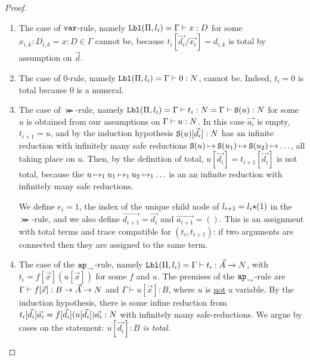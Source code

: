 \begin{proof}
\begin{enumerate}
\item
  The case of ${\tt var}$-rule, namely ${\tt Lbl}(\Pi,l_i) = \Gamma\vdash x:D$ 
  for some $x_{i,k}:D_{i,k} = x:D \in \Gamma$
  cannot be, because $t_i [\vec{d_i}/\vec{x_i}] = d_{i,k}$ is total  by assumption on $\vec{d}$.
  
\item
  The case of $0$-rule, namely ${\tt Lbl}(\Pi,l_i) = \Gamma\vdash 0:{N}$, 
  cannot be. Indeed, $t_i = 0$ is total because $0$ is a numeral.


\item 
  The case of $\Succ$-rule, 
namely ${\tt Lbl}(\Pi,l_i) = \Gamma\vdash t_i: {N} = \Gamma\vdash {\tt S}(u): {N}$
  for some $u$ is obtained from our assumptions on
  $\Gamma\vdash u: {N}$. In this case $\vec{a_i}$ is empty, $t_{i+1}=u$, and
  by the induction hypothesis ${\tt S}(u)[\vec{d_i}]:{N}$ has an infinite reduction with
  infinitely many safe reductions
  ${\tt S}(u) \mathbin{\mapsto}  {\tt S}(u_1) \mathbin{\mapsto} {\tt S}(u_2) \mathbin{\mapsto} \ldots$,
  all taking place on $u$.
  Then, by the definition of total, $u[\vec{d_i}] =t_{i+1}[\vec{d_i}] $ is not total, because the
 $u \mathbin{\mapsto}_1  u_1 \mathbin{\mapsto}_1 u_2 \mathbin{\mapsto}_1 \ldots$ is an  an infinite reduction with
  infinitely many safe reductions.

  We define $e_{i}=1$, 
  the index of the unique child node of $l_{i+1}=l_i{\star}(1)$ in the $\Succ$-rule, and
  we also define $\vec{d_{i+1}} = \vec{d_i}$ and $\vec{a_{i+1}} = ()$. 
  This is an assignment with total terms and 
  trace compatible for $(t_i,t_{i+1})$: if two arguments are connected then they are assigned
  to the same term. 



\item
  The case of the ${{\tt ap}_{\mbox{\tiny $\neg v$}}}$-rule, namely 
  ${\tt Lbl}(\Pi,l_i) = \Gamma\vdash t_i: \vec{A}\rightarrow{N}$, 
  with $t_i = f[\vec{x}](u[\vec{x}])$ for some $f$ and $u$.
  The premises of the ${{\tt ap}_{\mbox{\tiny $\neg v$}}}$-rule
   are $\Gamma\vdash f[\vec{x}]: B \rightarrow \vec{A}\rightarrow{N}$ 
  and $\Gamma\vdash u[\vec{x}]: B$, where $u$ is \underline{not} a variable.
  By the induction hypothesis, there is some infine reduction from
  $t_i[\vec{d_i}]\vec{a_i} = f[\vec{d_i}](u[\vec{d_i}])\vec{a_i}:{N}$ with infinitely many safe-reductions.
  We argue by cases on the statement: \emph{$u[\vec{d_i}]:B$ is total}.






\end{enumerate}
\end{proof}
